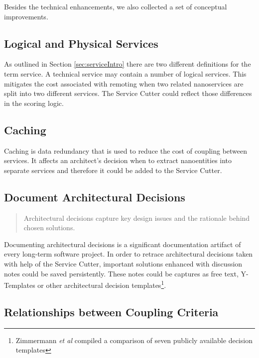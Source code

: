Besides the technical enhancements, we also collected a set of conceptual improvements.

\subsection{Logical and Physical Services}

As outlined in Section \ref{sec:serviceIntro} there are two different definitions for the term service. A technical service may contain a number of logical services. This mitigates the cost associated with remoting when two related nanoservices are split into two different services. The Service Cutter could reflect those differences in the scoring logic.

\subsection{Caching}

Caching is data redundancy that is used to reduce the cost of coupling between services. It affects an architect's decision when to extract nanoentities into separate services and therefore it could be added to the Service Cutter.

\subsection{Document Architectural Decisions}

\begin{quote}
	Architectural decisions capture key design issues and the rationale behind chosen solutions.\cite{zioAD}
\end{quote}

Documenting architectural decisions is a significant documentation artifact of every long-term software project. In order to retrace architectural decisions taken with help of the Service Cutter, important solutions enhanced with discussion notes could be saved persistently. These notes could be captures as free text, Y-Templates\cite{zimmermann2012yTemplate} or other architectural decision templates\footnote{Zimmermann \textit{et al} compiled a comparison of seven publicly available decision templates\cite[p. 3]{zimmermann2015architectural}}.

\subsection{Relationships between Coupling Criteria}

